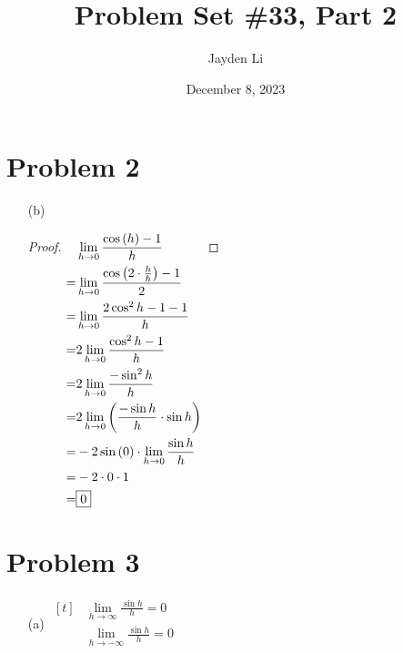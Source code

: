 \documentclass{article}
\title{Problem Set \#33, Part 2}
\author{Jayden Li}
\date{December 8, 2023}
\begin{document}

\linespread{1.25}
\fontsize{12pt}{12pt}\selectfont

\maketitle

\begin{multicols}{2}

\section*{Problem 2}
	\begin{itemize}
	\item[(b)]
	\begin{proof}
		$\begin{aligned}[t]
			&\lim\limits_{h\to0}\frac{\cos\left(h\right)-1}{h} \\
			=&\lim\limits_{h\to0}\frac{\cos\left(2\cdot\frac{h}{h}\right)-1}{2} \\
			=&\lim\limits_{h\to0}\frac{2\cos^2h-1-1}{h} \\
			=&2\lim\limits_{h\to0}\frac{\cos^2h-1}{h} \\
			=&2\lim\limits_{h\to0}\frac{-\sin^2h}{h} \\
			=&2\lim\limits_{h\to0}\left(\frac{-\sin h}{h}\cdot\sin h\right) \\
			=&-2\sin\left(0\right)\cdot\lim\limits_{h\to0}\frac{\sin h}{h} \\
			=&-2\cdot0\cdot1 \\
			=&\boxed{0}
		\end{aligned} \\$
	\end{proof}
\end{itemize}
\section*{Problem 3}
\begin{itemize}
	\item[(a)]
	$\begin{aligned}[t]
		&\lim\limits_{h\to\infty}\frac{\sin h}{h}=0 \\
		&\lim\limits_{h\to-\infty}\frac{\sin h}{h}=0 \\
	\end{aligned}$


\end{itemize}
\end{multicols}
\end{document}
